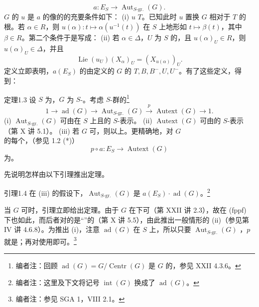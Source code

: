 \[a:E_S\longrightarrow\operatorname{Aut}_{S\text{-gr.}}(G).\tag{*}\]
$G$ 的 $u$ 是 $a$ 的像的的充要条件如下：
(i) $u$  $T$。已知此时 $u$ 置换 $G$ 相对于 $T$ 的根。若 $\alpha\in R$，则 $u(\alpha):t\mapsto\alpha(u^{-1}(t))$ 在 $S$ 上地形如 $t\mapsto\beta(t)$，其中 $\beta\in R$。第二个条件于是写成：
(ii) 若 $\alpha\in\Delta$，$U$ 为 $S$ 的，且 $u(\alpha)_U\in R$，则 $u(\alpha)_U\in\Delta$，并且
\[\operatorname{Lie}(u_U)(X_\alpha)_U=(X_{u(\alpha)})_U.\]
定义立即表明，$a(E_S)$ 的由定义的 $G$ 的 $T,B,B^-,U,U^-$。有了这些定义，得到：
\begin{SGAresult}{定理}{1.3}
设 $S$ 为，$G$ 为 $S$-。考虑 $S$-群的\footnote[2]{编者注：回顾 $\operatorname{ad}(G)=G/\operatorname{Centr}(G)$ 是 $G$ 的，参见 XXII 4.3.6。}
\[1\longrightarrow\operatorname{ad}(G)\longrightarrow\operatorname{Aut}_{S\text{-gr.}}(G)\xrightarrow p\operatorname{Autext}(G)\longrightarrow1.\]
(i) $\operatorname{Aut}_{S\text{-gr.}}(G)$ 可由在 $S$ 上且的 $S$-表示。
(ii) $\operatorname{Autext}(G)$ 可由的 $S$-表示（第 X 讲 5.1）。
(iii) 若 $G$ 可，则以上。更精确地，对 $G$ 的每个，（参见 1.2 (*)）
\[p\circ a:E_S\longrightarrow\operatorname{Autext}(G)\]
为。
\end{SGAresult}
先说明怎样由以下引理推出定理。
\begin{SGAresult}{引理}{1.4}
在 (iii) 的假设下，$\operatorname{Aut}_{S\text{-gr.}}(G)$ 是 $a(E_S)\cdot\operatorname{ad}(G)$。\footnote[3]{编者注：这里及下文将记号 $\operatorname{int}(G)$ 换成了 $\operatorname{ad}(G)$。}
\end{SGAresult}
当 $G$ 可时，引理立即给出定理。由于 $G$ 在下可（第 XXII 讲 2.3），故在 (fppf) 下也如此，而后者对的是“”的（第 X 讲 5.5），由此推出一般情形的 (ii)（参见第 IV 讲 4.6.8）。为推出 (i)，注意 $\operatorname{ad}(G)$ 在 $S$ 上，所以只要 $\operatorname{Aut}_{S\text{-gr.}}(G)$ ，$p$ 就是；再对使用即可。\footnote[4]{编者注：参见 SGA 1，VIII 2.1。}
